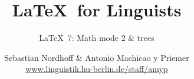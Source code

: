 


\title{
	\LaTeX\ for Linguists
}

\subtitle{\LaTeX\ 7: Math mode 2 \& trees}

\author[aMyP]{
	{\small Sebastian Nordhoff \& Antonio Machicao y Priemer}
	\\
	{\footnotesize \url{www.linguistik.hu-berlin.de/staff/amyp}}
}








\begin{frame}
  \HUtitle
\end{frame}





\nocite{Freitag&MyP15a}
\nocite{Knuth1986}
\nocite{Kopka94a}
\nocite{MyP17c}
\nocite{MyP&Kerkhof16a}
	


%
%
%
%
%



